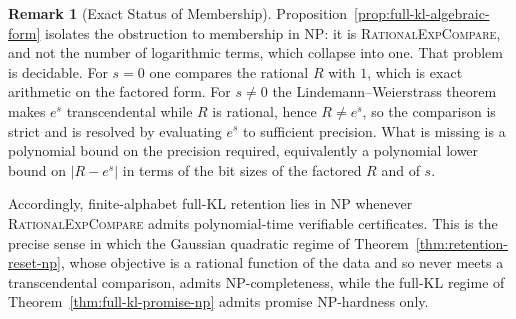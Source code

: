 \documentclass[12pt]{article}
\theoremstyle{definition}
\newtheorem{remark}[theorem]{Remark}
\begin{document}
\begin{remark}[Exact Status of Membership]
\label{rem:full-kl-exp-membership}
Proposition~\ref{prop:full-kl-algebraic-form} isolates the obstruction to
membership in NP: it is \textup{\textsc{RationalExpCompare}}, and not the number of
logarithmic terms, which collapse into one.  That problem is decidable.  For
$s=0$ one compares the rational $R$ with $1$, which is exact arithmetic on the
factored form.  For $s\neq0$ the Lindemann--Weierstrass theorem makes $e^{s}$
transcendental while $R$ is rational, hence $R\neq e^{s}$, so the comparison is
strict and is resolved by evaluating $e^{s}$ to sufficient precision.  What is
missing is a polynomial bound on the precision required, equivalently a
polynomial lower bound on $|R-e^{s}|$ in terms of the bit sizes of the factored
$R$ and of $s$.

Accordingly, finite-alphabet full-KL retention lies in NP whenever
\textup{\textsc{RationalExpCompare}} admits polynomial-time verifiable certificates.
This is the precise sense in which the Gaussian quadratic regime of
Theorem~\ref{thm:retention-reset-np}, whose objective is a rational function of
the data and so never meets a transcendental comparison, admits
NP-completeness, while the full-KL regime of
Theorem~\ref{thm:full-kl-promise-np} admits promise NP-hardness only.
\end{remark}
\end{document}

